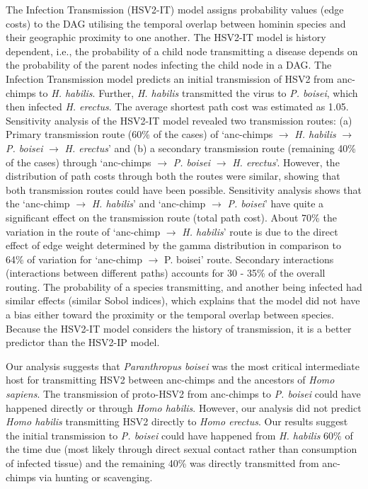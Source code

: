 \documentclass[fleqn,10pt]{wlscirep}
\begin{document}
The Infection Transmission (HSV2-IT) model assigns probability values (edge costs) to the DAG utilising the temporal overlap between hominin species and their geographic proximity to one another. The HSV2-IT model is history dependent, i.e., the probability of a child node transmitting a disease depends on the probability of the parent nodes infecting the child node in a DAG. The Infection Transmission model predicts an initial transmission of HSV2 from anc-chimps to \textit{H. habilis}. Further, \textit{H. habilis} transmitted the virus to \textit{P. boisei}, which then infected \textit{H. erectus}. The average shortest path cost was estimated as 1.05. Sensitivity analysis of the HSV2-IT model revealed two transmission routes: (a) Primary transmission route (60\% of the cases) of `anc-chimps $\rightarrow$ \textit{H. habilis} $\rightarrow$ \textit{P. boisei} $\rightarrow$ \textit{H. erectus}' and (b) a secondary transmission route (remaining 40\% of the cases) through `anc-chimps $\rightarrow$ \textit{P. boisei} $\rightarrow$ \textit{H. erectus}'. However, the distribution of path costs through both the routes were similar, showing that both transmission routes could have been possible. Sensitivity analysis shows that the `anc-chimp $\rightarrow$ \textit{H. habilis}' and `anc-chimp $\rightarrow$ \textit{P. boisei}' have quite a significant effect on the transmission route (total path cost). About 70\% the variation in the route of `anc-chimp $\rightarrow$ \textit{H. habilis}' route is due to the direct effect of edge weight determined by the gamma distribution in comparison to 64\% of variation for `anc-chimp $\rightarrow$ P. boisei' route. Secondary interactions (interactions between different paths) accounts for 30 - 35\% of the overall routing. The probability of a species transmitting, and another being infected had similar effects (similar Sobol indices), which explains that the model did not have a bias either toward the proximity or the temporal overlap between species. Because the HSV2-IT model considers the history of transmission, it is a better predictor than the HSV2-IP model.

Our analysis suggests that \textit{Paranthropus boisei} was the most critical intermediate host for transmitting HSV2 between anc-chimps and the ancestors of \textit{Homo sapiens}. The transmission of proto-HSV2 from anc-chimps to \textit{P. boisei} could have happened directly or through \textit{Homo habilis}. However, our analysis did not predict \textit{Homo habilis} transmitting HSV2 directly to \textit{Homo erectus}. Our results suggest the initial transmission to \textit{P. boisei} could have happened from \textit{H. habilis} 60\% of the time due (most likely through direct sexual contact rather than consumption of infected tissue) and the remaining 40\% was directly transmitted from anc-chimps via hunting or scavenging.
\end{document}

